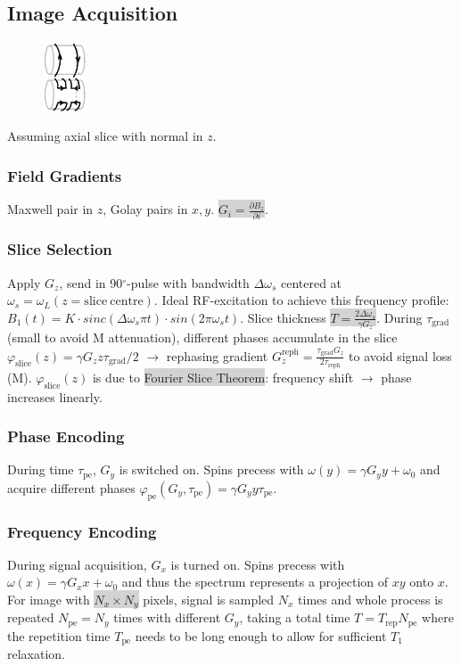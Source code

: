 \documentclass[9pt]{article}
\newcommand{\grey}[1]{\setlength{\fboxsep}{0pt}\colorbox{lightgrey}{#1}}
\newcommand{\del}{\partial}
\begin{document}
\begin{multicols}{2}
\subsection{Image Acquisition}
\begin{figure}
	\vspace{-4mm}
	\includegraphics[width=1.3cm,]{maxwellgolay.png}
\end{figure}
Assuming axial slice with normal in $z$.
\subsubsection{Field Gradients}
Maxwell pair in $z$, Golay pairs in $x,y$. \grey{$G_i = \frac{\del B_z}{\del i}$}.

\subsubsection{Slice Selection}
Apply $G_z$, send in 90${}^\circ$-pulse with bandwidth $\Delta \omega_s$ centered at $\omega_s = \omega_L(z=\mathrm{slice\ centre})$. Ideal RF-excitation to achieve this frequency profile: $B_1(t)= K \cdot sinc(\Delta \omega _s \pi t) \cdot sin(2\pi \omega _s t)$. Slice thickness \grey{$T = \frac{2\Delta\omega_s}{\gamma G_z}$}. During $\tau_\mathrm{grad}$(small to avoid M attenuation), different phases accumulate in the slice $\varphi_\mathrm{slice}(z) = \gamma G_z z \tau_\mathrm{grad}\textit{/2}$ $\rightarrow$ rephasing gradient $G_z^\mathrm{reph} = \frac{\tau_\mathrm{grad} G_z}{2 \tau_\mathrm{reph}}$ to avoid signal loss (M). $\varphi_\mathrm{slice}(z)$ is due to \grey{Fourier Slice Theorem}: frequency shift $\rightarrow$ phase increases linearly.

\subsubsection{Phase Encoding}
During time $\tau_\mathrm{pe}$, $G_y$ is switched on. Spins precess with $\omega(y) = \gamma G_y y + \omega_0$ and acquire different phases $\varphi_\mathrm{pe}(G_y, \tau_\mathrm{pe}) = \gamma G_y y \tau_\mathrm{pe}$.

\subsubsection{Frequency Encoding}
During signal acquisition, $G_x$ is turned on. Spins precess with $\omega(x) = \gamma G_x x + \omega_0$ and thus the spectrum represents a projection of $xy$ onto $x$. For image with \grey{$N_x\times N_y$} pixels, signal is sampled $N_x$ times and whole process is repeated $N_\mathrm{pe}=N_y$ times with different $G_y$, taking a total time $T=T_\mathrm{rep} N_\mathrm{pe}$ where the repetition time $T_\mathrm{pe}$ needs to be long enough to allow for sufficient $T_1$ relaxation.


\end{multicols}
\end{document}
